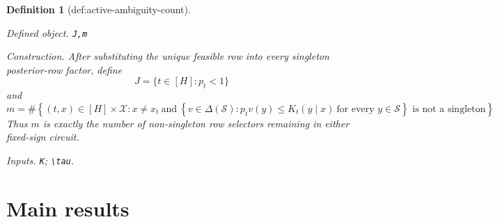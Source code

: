 \documentclass{article}
\newtheorem{definition}{Definition}
\begin{document}
\begin{definition}[def:active-ambiguity-count]\label{def:active-ambiguity-count}
\par\smallskip\noindent\emph{Defined object.} \texttt{J,\allowbreak{}m}
\par\smallskip\noindent\emph{Construction.} After substituting the unique feasible row into every singleton posterior-row factor, define
\[
 J=\{t\in[H]:p_t<1\}
\]
and
\[
 m=\#\left\{(t,x)\in[H]\times\mathcal X:
 x\ne x_t\ \text{and}\ 
 \left\{v\in\Delta(\mathcal S):p_tv(y)\le K_t(y\mid x)
 \ \text{for every }y\in\mathcal S\right\}
 \text{ is not a singleton}\right\}.
\]
Thus \(m\) is exactly the number of non-singleton row selectors remaining in either fixed-sign circuit.
\par\smallskip\noindent\emph{Inputs.} \texttt{K}; \texttt{\textbackslash{}\allowbreak{}tau}.
\end{definition}

\section{Main results}
\end{document}
